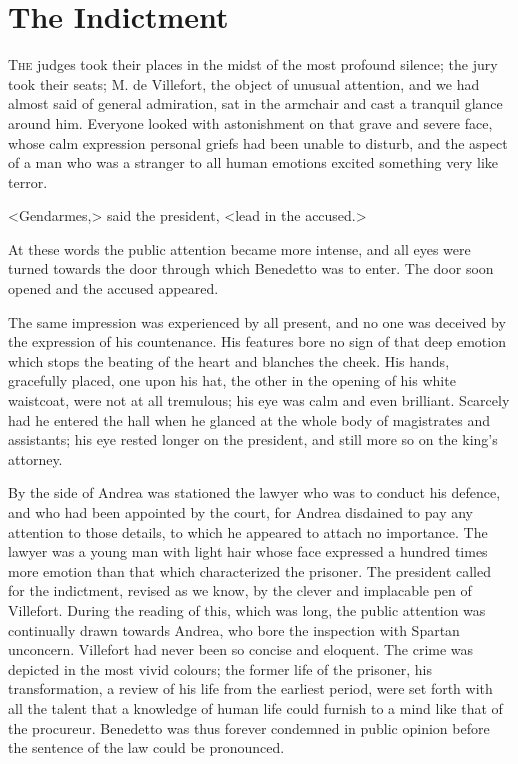 \chapter{The Indictment} 

 \lettrine{T}{he} judges took their places in the midst of the most profound silence; the jury took their seats; M. de Villefort, the object of unusual attention, and we had almost said of general admiration, sat in the armchair and cast a tranquil glance around him. Everyone looked with astonishment on that grave and severe face, whose calm expression personal griefs had been unable to disturb, and the aspect of a man who was a stranger to all human emotions excited something very like terror. 

 <Gendarmes,> said the president, <lead in the accused.> 

 At these words the public attention became more intense, and all eyes were turned towards the door through which Benedetto was to enter. The door soon opened and the accused appeared. 

 The same impression was experienced by all present, and no one was deceived by the expression of his countenance. His features bore no sign of that deep emotion which stops the beating of the heart and blanches the cheek. His hands, gracefully placed, one upon his hat, the other in the opening of his white waistcoat, were not at all tremulous; his eye was calm and even brilliant. Scarcely had he entered the hall when he glanced at the whole body of magistrates and assistants; his eye rested longer on the president, and still more so on the king's attorney. 

 By the side of Andrea was stationed the lawyer who was to conduct his defence, and who had been appointed by the court, for Andrea disdained to pay any attention to those details, to which he appeared to attach no importance. The lawyer was a young man with light hair whose face expressed a hundred times more emotion than that which characterized the prisoner.  The president called for the indictment, revised as we know, by the clever and implacable pen of Villefort. During the reading of this, which was long, the public attention was continually drawn towards Andrea, who bore the inspection with Spartan unconcern. Villefort had never been so concise and eloquent. The crime was depicted in the most vivid colours; the former life of the prisoner, his transformation, a review of his life from the earliest period, were set forth with all the talent that a knowledge of human life could furnish to a mind like that of the procureur. Benedetto was thus forever condemned in public opinion before the sentence of the law could be pronounced. 


